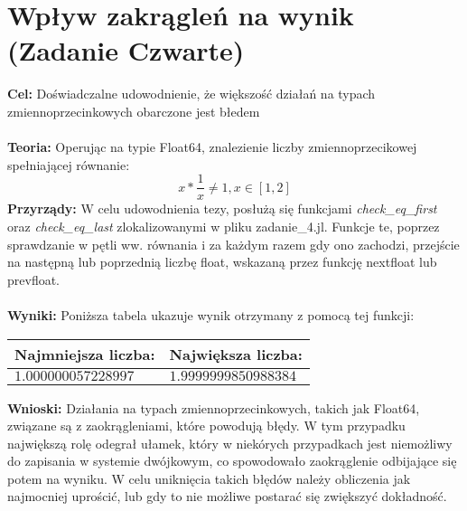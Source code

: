 \documentclass{article}
\begin{document}
\section{Wpływ zakrągleń na wynik (Zadanie Czwarte)}
\noindent \textbf{Cel:} Doświadczalne udowodnienie, że większość działań na typach zmiennoprzecinkowych obarczone jest błedem \\\\
\noindent \textbf{Teoria:} Operując na typie Float64, znalezienie liczby zmiennoprzecikowej spełniającej równanie:
$$x * \frac{1}{x} \neq 1, x \in [1,2]$$
\noindent \textbf{Przyrządy:} W celu udowodnienia tezy, posłużą się funkcjami \textit{check\_eq\_first} oraz \textit{check\_eq\_last} zlokalizowanymi w pliku zadanie\_4.jl. Funkcje te, poprzez sprawdzanie w pętli ww. równania i za każdym razem gdy ono zachodzi, przejście na następną lub poprzednią liczbę float, wskazaną przez funkcję nextfloat lub prevfloat.\\\\
\noindent \textbf{Wyniki:} Poniższa tabela ukazuje wynik otrzymany z pomocą tej funkcji:
\begin{center}
  \begin{tabular}{|p{}|p{}|} \hline
    \textbf{Najmniejsza liczba:} & \textbf{Największa liczba:} \\
    \hline
    $1.000000057228997$ & $1.9999999850988384$ \\
    \hline
  \end{tabular}
\end{center}
\noindent \textbf{Wnioski:} Działania na typach zmiennoprzecinkowych, takich jak Float64, związane są z zaokrągleniami, które powodują błędy. W tym przypadku największą rolę odegrał ułamek, który w niekórych przypadkach jest niemożliwy do zapisania w systemie dwójkowym, co spowodowało zaokrąglenie odbijające się potem na wyniku. W celu uniknięcia takich błędów należy obliczenia jak najmocniej uprościć, lub gdy to nie możliwe postarać się zwiększyć dokładność.
\end{document}
